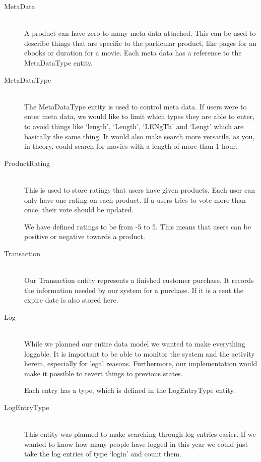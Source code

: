 \begin{description}
\item[MetaData] \hfill \\
A product can have zero-to-many meta data attached. This can be used to describe things that are specific to the particular product, like pages for an ebooks or duration for a movie. Each meta data has a reference to the MetaDataType entity.

\item[MetaDataType] \hfill \\
The MetaDataType entity is used to control meta data. If users were to enter meta data, we would like to limit which types they are able to enter, to avoid things like `length', `Length', `LENgTh' and `Lengt' which are basically the same thing. It would also make search more versatile, as you, in theory, could search for movies with a length of more than 1 hour.

\item[ProductRating] \hfill \\
This is used to store ratings that users have given products. Each user can only have one rating on each product. If a users tries to vote more than once, their vote should be updated.

We have defined ratings to be from -5 to 5. This means that users can be positive or negative towards a product.

\item[Transaction] \hfill \\
Our Transaction entity represents a finished customer purchase.  It records the information needed by our system for a purchase. If it is a rent the expire date is also stored here.

\item[Log] \hfill \\
While we planned our entire data model we wanted to make everything loggable. It is important to be able to monitor the system and the activity herein, especially for legal reasons. Furthermore, our implementation would make it possible to revert things to previous states.

Each entry has a type, which is defined in the LogEntryType entity.

\item[LogEntryType] \hfill \\
This entity was planned to make searching through log entries easier. If we wanted to know how many people have logged in this year we could just take the log entries of type `login' and count them.
\end{description}